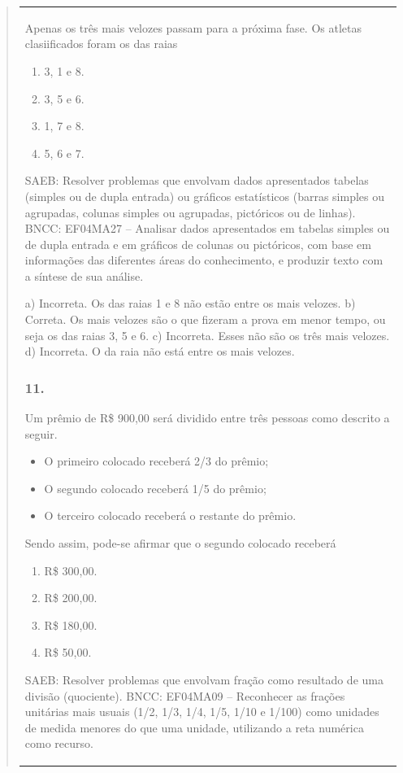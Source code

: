 \begin{mdframed}[linewidth=2pt,linecolor=salmao,roundcorner=2pt]
\begin{itemize}
{\begin{itemize}
\begin{escolha}
{\begin{quote}
{\begin{escolha}
{{{{{\begin{longtable}[]{@{}l@{}}
\begin{itemize}
{Apenas os três mais velozes passam para a próxima fase.
Os atletas clasiificados foram os das raias

\begin{enumerate}
\item
  3, 1 e 8.
\item
  3, 5 e 6.
\item
  1, 7 e 8.
\item
  5, 6 e 7.
\end{enumerate}

SAEB: Resolver problemas que envolvam dados apresentados tabelas (simples ou
de dupla entrada) ou gráficos estatísticos (barras simples ou agrupadas,
colunas simples ou agrupadas, pictóricos ou de linhas).
BNCC: EF04MA27 -- Analisar dados apresentados em tabelas simples ou de dupla entrada e em gráficos de
colunas ou pictóricos, com base em informações das diferentes áreas do conhecimento, e produzir
texto com a síntese de sua análise.

a) Incorreta. Os das raias 1 e 8 não estão entre os mais velozes.
b) Correta. Os mais velozes são o que fizeram a prova em menor tempo, ou seja os das raias 3, 5 e 6.
c) Incorreta. Esses não são os três mais velozes.
d) Incorreta. O da raia não está entre os mais velozes.

\subsubsection{11.}

Um prêmio de R\$ 900,00 será dividido entre três pessoas como descrito a seguir.

\begin{itemize}
\item
  O primeiro colocado receberá 2/3 do prêmio;
\item
  O segundo colocado receberá 1/5 do prêmio;
\item
  O terceiro colocado receberá o restante do prêmio.
\end{itemize}

Sendo assim, pode-se afirmar que o segundo colocado receberá

\begin{enumerate}
\item
  R\$ 300,00.
\item
  R\$ 200,00.
\item
  R\$ 180,00.
\item
  R\$ 50,00.
\end{enumerate}

SAEB: Resolver problemas que envolvam fração como resultado
de uma divisão (quociente).
BNCC: EF04MA09 -- Reconhecer as frações unitárias mais usuais (1/2, 1/3, 1/4, 1/5, 1/10 e 1/100) como
unidades de medida menores do que uma unidade, utilizando a reta numérica como recurso.

}
\end{itemize}
\end{longtable}}}}}}
\end{escolha}}
\end{quote}}
\end{escolha}
\end{itemize}}
\end{itemize}
\end{mdframed}
